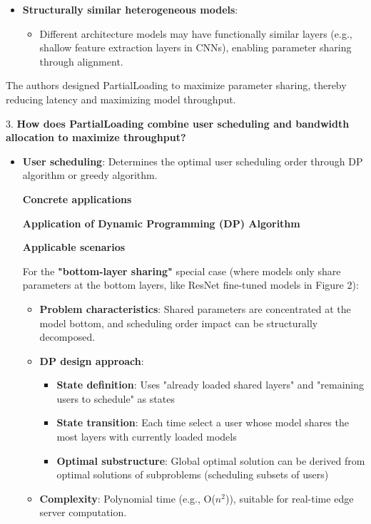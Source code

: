 \documentclass[conference]{IEEEtran}
\begin{document}
\begin{CJK}{UTF8}{gbsn}
\begin{itemize}
\item \textbf{Structurally similar heterogeneous models}:
\begin{itemize}
\item Different architecture models may have functionally similar layers (e.g., shallow feature extraction layers in CNNs), enabling parameter sharing through alignment.
\end{itemize}
\end{itemize}

The authors designed PartialLoading to maximize parameter sharing, thereby reducing latency and maximizing model throughput.

3. \textbf{How does PartialLoading combine user scheduling and bandwidth allocation to maximize throughput?}

\begin{itemize}
\item \textbf{User scheduling}: Determines the optimal user scheduling order through DP algorithm or greedy algorithm.

\textbf{Concrete applications}

\textbf{Application of Dynamic Programming (DP) Algorithm}

\textbf{Applicable scenarios}

For the \textbf{"bottom-layer sharing"} special case (where models only share parameters at the bottom layers, like ResNet fine-tuned models in Figure 2):

\begin{itemize}
\item \textbf{Problem characteristics}: Shared parameters are concentrated at the model bottom, and scheduling order impact can be structurally decomposed.
\item \textbf{DP design approach}:
\begin{itemize}
\item \textbf{State definition}: Uses "already loaded shared layers" and "remaining users to schedule" as states
\item \textbf{State transition}: Each time select a user whose model shares the most layers with currently loaded models
\item \textbf{Optimal substructure}: Global optimal solution can be derived from optimal solutions of subproblems (scheduling subsets of users)
\end{itemize}
\item \textbf{Complexity}: Polynomial time (e.g., O($n^2$)), suitable for real-time edge server computation.
\end{itemize}


\end{itemize}
\end{CJK}
\end{document}
